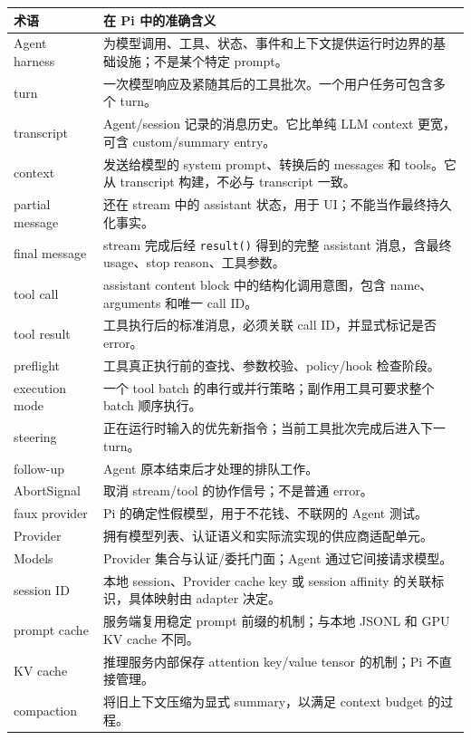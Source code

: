 \documentclass[UTF8,openany,11pt]{ctexbook}
\begin{document}
\begin{longtable}{p{}p{}}
\toprule
术语 & 在 Pi 中的准确含义\\
\midrule
Agent harness & 为模型调用、工具、状态、事件和上下文提供运行时边界的基础设施；不是某个特定 prompt。\\
turn & 一次模型响应及紧随其后的工具批次。一个用户任务可包含多个 turn。\\
transcript & Agent/session 记录的消息历史。它比单纯 LLM context 更宽，可含 custom/summary entry。\\
context & 发送给模型的 system prompt、转换后的 messages 和 tools。它从 transcript 构建，不必与 transcript 一致。\\
partial message & 还在 stream 中的 assistant 状态，用于 UI；不能当作最终持久化事实。\\
final message & stream 完成后经 \texttt{result()} 得到的完整 assistant 消息，含最终 usage、stop reason、工具参数。\\
tool call & assistant content block 中的结构化调用意图，包含 name、arguments 和唯一 call ID。\\
tool result & 工具执行后的标准消息，必须关联 call ID，并显式标记是否 error。\\
preflight & 工具真正执行前的查找、参数校验、policy/hook 检查阶段。\\
execution mode & 一个 tool batch 的串行或并行策略；副作用工具可要求整个 batch 顺序执行。\\
steering & 正在运行时输入的优先新指令；当前工具批次完成后进入下一 turn。\\
follow-up & Agent 原本结束后才处理的排队工作。\\
AbortSignal & 取消 stream/tool 的协作信号；不是普通 error。\\
faux provider & Pi 的确定性假模型，用于不花钱、不联网的 Agent 测试。\\
Provider & 拥有模型列表、认证语义和实际流实现的供应商适配单元。\\
Models & Provider 集合与认证/委托门面；Agent 通过它间接请求模型。\\
session ID & 本地 session、Provider cache key 或 session affinity 的关联标识，具体映射由 adapter 决定。\\
prompt cache & 服务端复用稳定 prompt 前缀的机制；与本地 JSONL 和 GPU KV cache 不同。\\
KV cache & 推理服务内部保存 attention key/value tensor 的机制；Pi 不直接管理。\\
compaction & 将旧上下文压缩为显式 summary，以满足 context budget 的过程。\\
\bottomrule
\end{longtable}
\end{document}
